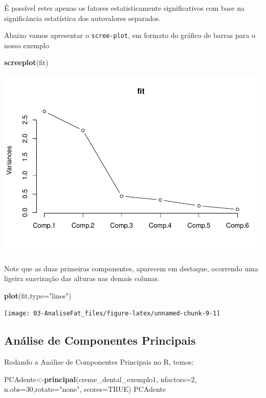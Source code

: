 \documentclass[12pt,brazil,oneside]{book}
\newenvironment{Shaded}{\begin{snugshade}}{\end{snugshade}}
\newcommand{\DataTypeTok}[1]{\textcolor[rgb]{0.13,0.29,0.53}{#1}}
\newcommand{\DecValTok}[1]{\textcolor[rgb]{0.00,0.00,0.81}{#1}}
\newcommand{\KeywordTok}[1]{\textcolor[rgb]{0.13,0.29,0.53}{\textbf{#1}}}
\newcommand{\NormalTok}[1]{#1}
\newcommand{\OtherTok}[1]{\textcolor[rgb]{0.56,0.35,0.01}{#1}}
\newcommand{\StringTok}[1]{\textcolor[rgb]{0.31,0.60,0.02}{#1}}
\begin{document}
É possível reter apenas os fatores estatisticamente significativos com
base na significância estatística dos autovalores separados.

Abaixo vamos apresentar o \texttt{scree-plot}, em formato do gráfico de
barras para o nosso exemplo

\begin{Shaded}
\begin{Highlighting}[]
\KeywordTok{screeplot}\NormalTok{(fit)}
\end{Highlighting}
\end{Shaded}

\begin{center}\includegraphics[width=0.6\linewidth]{03-AnaliseFat_files/figure-latex/unnamed-chunk-8-1} \end{center}

Note que as duas primeiras componentes, aparecem em destaque, ocorrendo
uma ligeira suavização das alturas nas demais colunas.

\begin{Shaded}
\begin{Highlighting}[]
\KeywordTok{plot}\NormalTok{(fit,}\DataTypeTok{type=}\StringTok{"lines"}\NormalTok{)}
\end{Highlighting}
\end{Shaded}

\begin{center}\texttt{[image: 03-AnaliseFat\_files/figure-latex/unnamed-chunk-9-1]} \end{center}

\hypertarget{analise-de-componentes-principais}{%
\subsection{Análise de Componentes
Principais}\label{analise-de-componentes-principais}}

Rodando a Análise de Componentes Principais no R, temos:

\begin{Shaded}
\begin{Highlighting}[]
\NormalTok{PCAdente<-}\KeywordTok{principal}\NormalTok{(creme_dental_exemplo1, }\DataTypeTok{nfactors=}\DecValTok{2}\NormalTok{,}
                \DataTypeTok{n.obs=}\DecValTok{30}\NormalTok{,}\DataTypeTok{rotate=}\StringTok{"none"}\NormalTok{, }\DataTypeTok{scores=}\OtherTok{TRUE}\NormalTok{)}
\NormalTok{PCAdente}
\end{Highlighting}
\end{Shaded}
\end{document}
